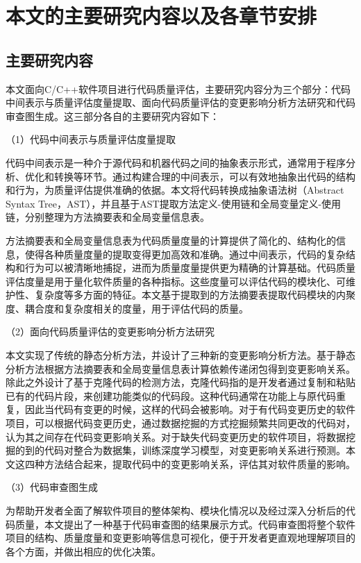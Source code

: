 \section{本文的主要研究内容以及各章节安排}
\subsection{主要研究内容}
本文面向C/C++软件项目进行代码质量评估，主要研究内容分为三个部分：代码中间表示与质量评估度量提取、面向代码质量评估的变更影响分析方法研究和代码审查图生成。这三部分各自的主要研究内容如下：

（1）代码中间表示与质量评估度量提取

代码中间表示是一种介于源代码和机器代码之间的抽象表示形式，通常用于程序分析、优化和转换等环节。通过构建合理的中间表示，可以有效地抽象出代码的结构和行为，为质量评估提供准确的依据。本文将代码转换成抽象语法树（Abstract Syntax Tree，AST），并且基于AST提取方法定义-使用链和全局变量定义-使用链，分别整理为方法摘要表和全局变量信息表。

方法摘要表和全局变量信息表为代码质量度量的计算提供了简化的、结构化的信息，使得各种质量度量的提取变得更加高效和准确。通过中间表示，代码的复杂结构和行为可以被清晰地捕捉，进而为质量度量提供更为精确的计算基础。代码质量评估度量是用于量化软件质量的各种指标。这些度量可以评估代码的模块化、可维护性、复杂度等多方面的特征。本文基于提取到的方法摘要表提取代码模块的内聚度、耦合度和复杂度相关的度量，用于评估代码的质量。

（2）面向代码质量评估的变更影响分析方法研究

本文实现了传统的静态分析方法，并设计了三种新的变更影响分析方法。基于静态分析方法根据方法摘要表和全局变量信息表计算依赖传递闭包得到变更影响关系。除此之外设计了基于克隆代码的检测方法，克隆代码指的是开发者通过复制和粘贴已有的代码片段，来创建功能类似的代码段。这种代码通常在功能上与原代码重复，因此当代码有变更的时候，这样的代码会被影响。对于有代码变更历史的软件项目，可以根据代码变更历史，通过数据挖掘的方式挖掘频繁共同更改的代码对，认为其之间存在代码变更影响关系。对于缺失代码变更历史的软件项目，将数据挖掘的到的代码对整合为数据集，训练深度学习模型，对变更影响关系进行预测。本文这四种方法结合起来，提取代码中的变更影响关系，评估其对软件质量的影响。



（3）代码审查图生成

为帮助开发者全面了解软件项目的整体架构、模块化情况以及经过深入分析后的代码质量，本文提出了一种基于代码审查图的结果展示方式。代码审查图将整个软件项目的结构、质量度量和变更影响等信息可视化，便于开发者更直观地理解项目的各个方面，并做出相应的优化决策。

